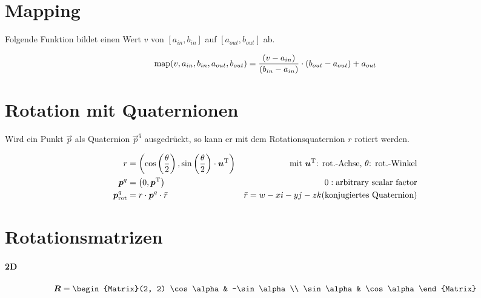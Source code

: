 \documentclass[a4paper]{scrartcl}
\begin{document}
\section{Mapping}

Folgende Funktion bildet einen Wert $v$ von $[a_{in}, b_{in}]$ auf $[a_{out}, b_{out}]$ ab.

\[
  {\mathord{\rm {map}}}(v, a_{in}, b_{in}, a_{out}, b_{out})
  =
  \frac{ (v - a_{in}) }{ (b_{in} - a_{in}) } \cdot (b_{out} - a_{out}) + a_{out}
\]

\section{Rotation mit Quaternionen}

Wird ein Punkt $\vec{p}$ als Quaternion $\vec{p}^q$ ausgedrückt, so kann er mit dem Rotationsquaternion $r$ rotiert werden.

\begin{align*}
  r &= \left( \cos\left(\frac{\theta}{2}\right), \sin\left(\frac{\theta}{2}\right) \cdot {\mbox{\boldmath$u$}}\textsuperscript{T} \right) & \textrm{mit {\mbox{\boldmath$u$}}\textsuperscript{T}: rot.-Achse, $\theta$: rot.-Winkel}
\\
  \mbox{\boldmath$p$}^q &= \left( 0, {\mbox{\boldmath$p$}}\textsuperscript{T} \right) & 0: \textrm{arbitrary scalar factor}
\\
\mbox{\boldmath$p$}^q_{\textrm{rot}} &= r \cdot \mbox{\boldmath$p$}^q \cdot \bar{r} & \bar{r} = w-xi-yj-zk \textrm{(konjugiertes Quaternion)}
\end{align*}

\section{Rotationsmatrizen}
\paragraph{2D}

\[
  \mat{R} = \begin{Matrix}(2, 2) \cos \alpha & -\sin \alpha \\ \sin \alpha & \cos \alpha \end{Matrix}
\]
\end{document}
